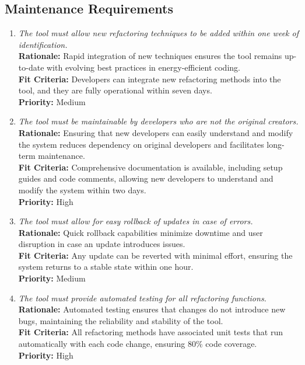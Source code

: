 \documentclass[12pt]{article}
\begin{document}
\subsection{Maintenance Requirements}
\begin{enumerate}[label=MS-MNT \arabic*., wide=0pt, leftmargin=*]
  \item \emph{The tool must allow new refactoring techniques to be added within one week of identification.}\\
  {\bf Rationale:} Rapid integration of new techniques ensures the tool remains up-to-date with evolving best practices in energy-efficient coding.\\
  {\bf Fit Criteria:} Developers can integrate new refactoring methods into the tool, and they are fully operational within seven days.\\
  {\bf Priority:} Medium

  \item \emph{The tool must be maintainable by developers who are not the original creators.}\\
  {\bf Rationale:} Ensuring that new developers can easily understand and modify the system reduces dependency on original developers and facilitates long-term maintenance.\\
  {\bf Fit Criteria:} Comprehensive documentation is available, including setup guides and code comments, allowing new developers to understand and modify the system within two days.\\
  {\bf Priority:} High

  \item \emph{The tool must allow for easy rollback of updates in case of errors.}\\
  {\bf Rationale:} Quick rollback capabilities minimize downtime and user disruption in case an update introduces issues.\\
  {\bf Fit Criteria:} Any update can be reverted with minimal effort, ensuring the system returns to a stable state within one hour.\\
  {\bf Priority:} Medium

  \item \emph{The tool must provide automated testing for all refactoring functions.}\\
  {\bf Rationale:} Automated testing ensures that changes do not introduce new bugs, maintaining the reliability and stability of the tool.\\
  {\bf Fit Criteria:} All refactoring methods have associated unit tests that run automatically with each code change, ensuring 80\% code coverage.\\
  {\bf Priority:} High


\end{enumerate}
\end{document}
